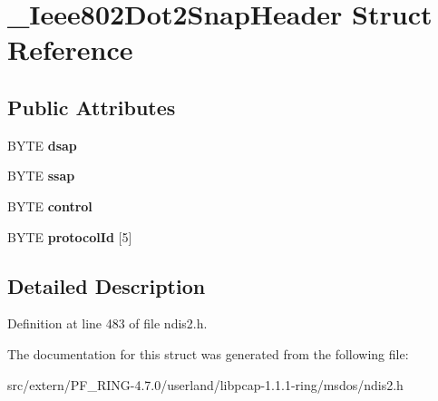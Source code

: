 \hypertarget{struct___ieee802_dot2_snap_header}{
\section{\_\-Ieee802Dot2SnapHeader Struct Reference}
\label{struct___ieee802_dot2_snap_header}
}
\subsection*{Public Attributes}
\begin{DoxyCompactItemize}
\item 
\hypertarget{struct___ieee802_dot2_snap_header_adf16184c9bcb100f1c0efafe158b48ec}{
BYTE {\bfseries dsap}}
\label{struct___ieee802_dot2_snap_header_adf16184c9bcb100f1c0efafe158b48ec}

\item 
\hypertarget{struct___ieee802_dot2_snap_header_aa1ec52a54c6f4ad53705c0c8ae58f831}{
BYTE {\bfseries ssap}}
\label{struct___ieee802_dot2_snap_header_aa1ec52a54c6f4ad53705c0c8ae58f831}

\item 
\hypertarget{struct___ieee802_dot2_snap_header_a211cd1970b0f07ceedc001a36f93b9bd}{
BYTE {\bfseries control}}
\label{struct___ieee802_dot2_snap_header_a211cd1970b0f07ceedc001a36f93b9bd}

\item 
\hypertarget{struct___ieee802_dot2_snap_header_a868b88707f5e55f8767d112d55788ae2}{
BYTE {\bfseries protocolId} \mbox{[}5\mbox{]}}
\label{struct___ieee802_dot2_snap_header_a868b88707f5e55f8767d112d55788ae2}

\end{DoxyCompactItemize}


\subsection{Detailed Description}


Definition at line 483 of file ndis2.h.



The documentation for this struct was generated from the following file:\begin{DoxyCompactItemize}
\item 
src/extern/PF\_\-RING-\/4.7.0/userland/libpcap-\/1.1.1-\/ring/msdos/ndis2.h\end{DoxyCompactItemize}
